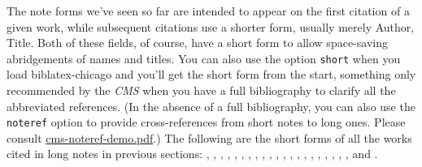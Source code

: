 \documentclass[a4paper,12pt]{article}
\begin{document}
\begin{refsection}

  The  note forms we've
  seen so far are intended to appear on the first citation of a given
  work, while subsequent citations use a shorter form, usually merely
  \textsf{Author}, \textsf{Title}.  Both of these fields, of course,
  have a \textsf{short} form to allow space-saving abridgements of
  names and titles.  You can also use the option \texttt{short} when
  you load \textsf{biblatex-chicago} and you'll get the short form
  from the start, something only recommended by the \emph{CMS} when
  you have a full bibliography to clarify all the abbreviated
  references.  (In the absence of a full bibliography, you can also
  use the \texttt{noteref} option  to
  provide cross-references from short notes to long ones.  Please
  consult
  \href{file:cms-noteref-demo.pdf}{\textsf{cms-noteref-demo.pdf}}.)
  The following are the short forms of all the works cited in long
  notes in previous sections:
  ,
  ,
  ,
  ,
  ,
  ,
  ,
  ,
  ,
  ,
  ,
  ,
  ,
  ,
  ,
  ,
  ,
  ,
  ,
  ,
  , and
  .

  {\renewcommand{\notesname}{\normalsize Short-Note Style} \theendnotes}
\end{refsection}
\end{document}
